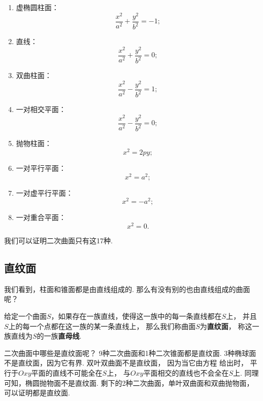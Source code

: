 \begin{enumerate}[label={\chinese*.}]
\begin{enumerate}[label={\arabic*.}]
		\item 虚椭圆柱面：\[
			\frac{x^2}{a^2}+\frac{y^2}{b^2}=-1;
		\]

		\item 直线：\[
			\frac{x^2}{a^2}+\frac{y^2}{b^2}=0;
		\]

		\item 双曲柱面：\[
			\frac{x^2}{a^2}-\frac{y^2}{b^2}=1;
		\]

		\item 一对相交平面：\[
			\frac{x^2}{a^2}-\frac{y^2}{b^2}=0;
		\]

		\item 抛物柱面：\[
			x^2=2py;
		\]

		\item 一对平行平面：\[
			x^2=a^2;
		\]

		\item 一对虚平行平面：\[
			x^2=-a^2;
		\]

		\item 一对重合平面：\[
			x^2=0.
		\]
	\end{enumerate}
\end{enumerate}
我们可以证明二次曲面只有这17种.

\subsection{直纹面}
我们看到，柱面和锥面都是由直线组成的.
那么有没有别的也由直线组成的曲面呢？

\begin{definition}
给定一个曲面\(S\)，如果存在一族直线，使得这一族中的每一条直线都在\(S\)上，
并且\(S\)上的每一个点都在这一族的某一条直线上，
那么我们称曲面\(S\)为\textbf{直纹面}，
称这一族直线为\(S\)的一族\textbf{直母线}.
\end{definition}

二次曲面中哪些是直纹面呢？
9种二次曲面和1种二次锥面都是直纹面.
3种椭球面不是直纹面，因为它有界.
双叶双曲面不是直纹面，
因为当它由方程  给出时，
平行于\(Oxy\)平面的直线不可能全在\(S\)上，
与\(Oxy\)平面相交的直线也不会全在\(S\)上.
同理可知，椭圆抛物面不是直纹面.
剩下的2种二次曲面，单叶双曲面和双曲抛物面，可以证明都是直纹面.

